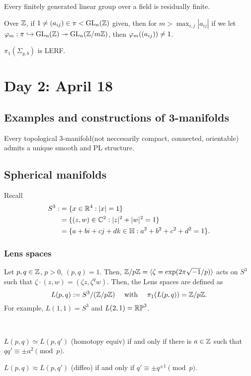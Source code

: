 \documentclass{../../small}
\begin{document}
\begin{thm}
Every finitely generated linear group over a field is residually finite.
\end{thm}

Over $\mathbb{Z}$, if $1\ne(a_{ij})\in\pi<\mathrm{GL}_n(\mathbb{Z})$ given, then for $m>\max_{i,j}|a_{ij}|$ if we let $\varphi_m:\pi\hookrightarrow\mathrm{GL}_n(\mathbb{Z})\twoheadrightarrow\mathrm{GL}_n(\mathbb{Z}/m\mathbb{Z})$, then $\varphi_m((a_{ij}))\ne1$.

\begin{thm}[Scott]
$\pi_1(\Sigma_{g,b})$ is LERF.
\end{thm}


\section{Day 2: April 18}

\subsection*{Examples and constructions of 3-manifolds}

\begin{thm}[Moise]
Every topological 3-manifold(not neccesarily compact, connected, orientable) admits a unique smooth and PL structure.
\end{thm}

\subsection{Spherical manifolds}

Recall
\begin{align*}
S^3:&=\{x\in\mathbb{R}^4:|x|=1\}\\
&=\{(z,w)\in\mathbb{C}^2:|z|^2+|w|^2=1\}\\
&=\{a+bi+cj+dk\in\mathbb{H}:a^2+b^2+c^2+d^2=1\}.
\end{align*}
\subsubsection*{Lens spaces}
Let $p,q\in\mathbb{Z}$, $p>0$, $(p,q)=1$.
Then, $\mathbb{Z}/p\mathbb{Z}=\langle\zeta=\exp(2\pi\sqrt{-1}/p)\rangle$ acts on $S^3$ such that $\zeta\cdot(z,w)=(\zeta z,\zeta^qw)$.
Then, the Lens spaces are defined as
\[L(p,q):=S^3/(\mathbb{Z}/p\mathbb{Z})\quad\text{ with }\quad\pi_1(L(p,q))=\mathbb{Z}/p\mathbb{Z}.\]
For example, $L(1,1)=S^3$ and $L(2,1)=\mathbb{RP}^3$.


\begin{thm}[Reidemeister]\,
\begin{parts}
\item $L(p,q)\simeq L(p,q')$ (homotopy equiv) if and only if there is $a\in\mathbb{Z}$ such that $qq'\equiv\pm a^2\pmod p$.
\item $L(p,q)\approx L(p,q')$ (diffeo) if and only if $q'\equiv\pm q^{\pm1}\pmod p$.
\end{parts}
\end{thm}
\end{document}
